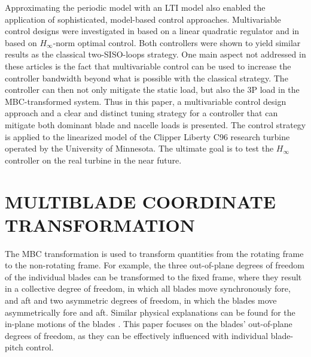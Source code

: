 \documentclass[times]{weauth}
\begin{document}
Approximating the periodic model with an LTI  model also
enabled the application of sophisticated, model-based control approaches.
Multivariable control designs were investigated in \cite{Bossanyi03a} based on a
linear quadratic regulator and in  \cite{Geyler08} based on ${H}_\infty$-norm
optimal control. Both controllers were shown to yield similar results
as the classical two-SISO-loops strategy.
One main aspect not addressed in these articles is
the fact that multivariable control can be used to increase the controller
bandwidth beyond what is possible with the classical strategy. The controller
can then not only mitigate the static load, but also the 3P load in the
MBC-transformed  system. Thus in this paper, a multivariable control design
approach and a clear and distinct tuning strategy for a controller that can
mitigate both dominant blade and nacelle loads is presented. The control strategy is
applied to the linearized model of the Clipper Liberty C96 research turbine
operated by the University of Minnesota. The ultimate goal is to test the
$H_\infty$ controller on the real turbine in the near future.


\section{MULTIBLADE COORDINATE TRANSFORMATION} The MBC transformation is used
to transform quantities from the rotating frame to the non-rotating frame.  For
example, the three out-of-plane degrees of freedom of the individual blades can
be transformed to the fixed frame, where they result in a collective degree of
freedom, in which all blades move synchronously fore, and aft and two asymmetric
degrees of freedom, in which the blades move asymmetrically fore and aft.
Similar physical explanations can be found for the in-plane motions of the
blades \cite{bir97}. This paper focuses on the blades' out-of-plane degrees of
freedom, as they can be effectively influenced with individual blade-pitch
control.
\end{document}
